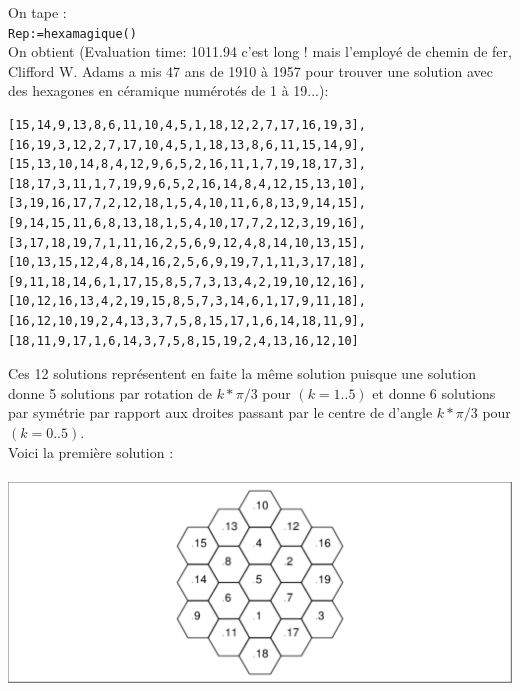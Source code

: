\documentclass[a4paper,11pt]{book}
\begin{document}
On tape :\\
{\tt Rep:=hexamagique()}\\
On obtient (Evaluation time: 1011.94 c'est long ! mais l'employ\'e de chemin de 
fer, Clifford W. Adams a mis 47 ans de 1910 \`a 1957 pour trouver une solution 
avec des hexagones en c\'eramique num\'erot\'es de 1 \`a 19...):
\begin{verbatim}
[15,14,9,13,8,6,11,10,4,5,1,18,12,2,7,17,16,19,3],
[16,19,3,12,2,7,17,10,4,5,1,18,13,8,6,11,15,14,9],
[15,13,10,14,8,4,12,9,6,5,2,16,11,1,7,19,18,17,3],
[18,17,3,11,1,7,19,9,6,5,2,16,14,8,4,12,15,13,10],
[3,19,16,17,7,2,12,18,1,5,4,10,11,6,8,13,9,14,15],
[9,14,15,11,6,8,13,18,1,5,4,10,17,7,2,12,3,19,16],
[3,17,18,19,7,1,11,16,2,5,6,9,12,4,8,14,10,13,15],
[10,13,15,12,4,8,14,16,2,5,6,9,19,7,1,11,3,17,18],
[9,11,18,14,6,1,17,15,8,5,7,3,13,4,2,19,10,12,16],
[10,12,16,13,4,2,19,15,8,5,7,3,14,6,1,17,9,11,18],
[16,12,10,19,2,4,13,3,7,5,8,15,17,1,6,14,18,11,9],
[18,11,9,17,1,6,14,3,7,5,8,15,19,2,4,13,16,12,10]
\end{verbatim}

Ces 12 solutions repr\'esentent en faite la m\^eme solution puisque une 
solution donne 5 solutions par rotation de $k*\pi/3$ pour $(k=1..5)$ et donne 
6 solutions par sym\'etrie par rapport aux droites passant par le centre de 
d'angle $k*\pi/3$ pour $(k=0..5)$.\\
Voici la premi\`ere solution :\\
\ \\
\includegraphics[width=\textwidth]{hexagone5}\\
\end{document}

